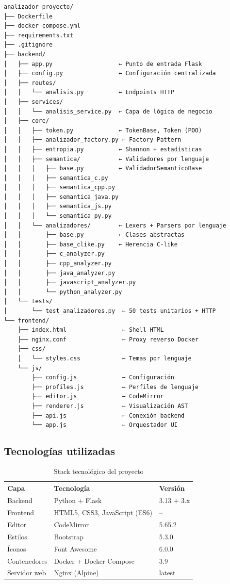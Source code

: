 \documentclass[12pt,a4paper]{article}
\begin{document}
\begin{verbatim}
analizador-proyecto/
├── Dockerfile
├── docker-compose.yml
├── requirements.txt
├── .gitignore
├── backend/
│   ├── app.py                   ← Punto de entrada Flask
│   ├── config.py                ← Configuración centralizada
│   ├── routes/
│   │   └── analisis.py          ← Endpoints HTTP
│   ├── services/
│   │   └── analisis_service.py  ← Capa de lógica de negocio
│   ├── core/
│   │   ├── token.py             ← TokenBase, Token (POO)
│   │   ├── analizador_factory.py ← Factory Pattern
│   │   ├── entropia.py          ← Shannon + estadísticas
│   │   ├── semantica/           ← Validadores por lenguaje
│   │   │   ├── base.py          ← ValidadorSemanticoBase
│   │   │   ├── semantica_c.py
│   │   │   ├── semantica_cpp.py
│   │   │   ├── semantica_java.py
│   │   │   ├── semantica_js.py
│   │   │   └── semantica_py.py
│   │   └── analizadores/        ← Lexers + Parsers por lenguaje
│   │       ├── base.py          ← Clases abstractas
│   │       ├── base_clike.py    ← Herencia C-like
│   │       ├── c_analyzer.py
│   │       ├── cpp_analyzer.py
│   │       ├── java_analyzer.py
│   │       ├── javascript_analyzer.py
│   │       └── python_analyzer.py
│   └── tests/
│       └── test_analizadores.py  ← 50 tests unitarios + HTTP
└── frontend/
    ├── index.html                ← Shell HTML
    ├── nginx.conf                ← Proxy reverso Docker
    ├── css/
    │   └── styles.css            ← Temas por lenguaje
    └── js/
        ├── config.js             ← Configuración
        ├── profiles.js           ← Perfiles de lenguaje
        ├── editor.js             ← CodeMirror
        ├── renderer.js           ← Visualización AST
        ├── api.js                ← Conexión backend
        └── app.js                ← Orquestador UI
\end{verbatim}

\subsection{Tecnologías utilizadas}

\begin{table}[H]
\centering
\caption{Stack tecnológico del proyecto}
\begin{tabular}{@{}lll@{}}
\toprule
\textbf{Capa} & \textbf{Tecnología} & \textbf{Versión} \\
\midrule
Backend & Python + Flask & 3.13 + 3.x \\
Frontend & HTML5, CSS3, JavaScript (ES6) & -- \\
Editor & CodeMirror & 5.65.2 \\
Estilos & Bootstrap & 5.3.0 \\
Íconos & Font Awesome & 6.0.0 \\
Contenedores & Docker + Docker Compose & 3.9 \\
Servidor web & Nginx (Alpine) & latest \\
\bottomrule
\end{tabular}
\end{table}
\end{document}
